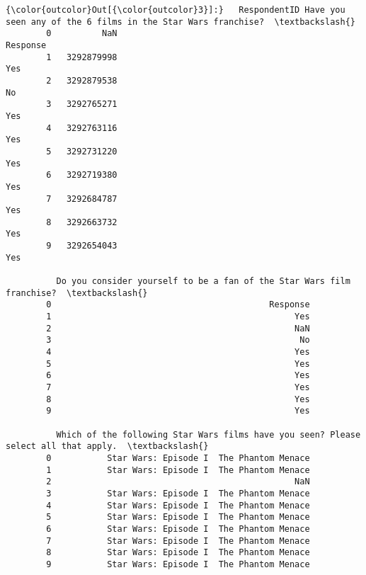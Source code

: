 \documentclass[11pt]{article}
\begin{document}
\begin{Verbatim}[commandchars=\\\{\}]
{\color{outcolor}Out[{\color{outcolor}3}]:}   RespondentID Have you seen any of the 6 films in the Star Wars franchise?  \textbackslash{}
        0          NaN                                           Response             
        1   3292879998                                                Yes             
        2   3292879538                                                 No             
        3   3292765271                                                Yes             
        4   3292763116                                                Yes             
        5   3292731220                                                Yes             
        6   3292719380                                                Yes             
        7   3292684787                                                Yes             
        8   3292663732                                                Yes             
        9   3292654043                                                Yes             
        
          Do you consider yourself to be a fan of the Star Wars film franchise?  \textbackslash{}
        0                                           Response                      
        1                                                Yes                      
        2                                                NaN                      
        3                                                 No                      
        4                                                Yes                      
        5                                                Yes                      
        6                                                Yes                      
        7                                                Yes                      
        8                                                Yes                      
        9                                                Yes                      
        
          Which of the following Star Wars films have you seen? Please select all that apply.  \textbackslash{}
        0           Star Wars: Episode I  The Phantom Menace                                    
        1           Star Wars: Episode I  The Phantom Menace                                    
        2                                                NaN                                    
        3           Star Wars: Episode I  The Phantom Menace                                    
        4           Star Wars: Episode I  The Phantom Menace                                    
        5           Star Wars: Episode I  The Phantom Menace                                    
        6           Star Wars: Episode I  The Phantom Menace                                    
        7           Star Wars: Episode I  The Phantom Menace                                    
        8           Star Wars: Episode I  The Phantom Menace                                    
        9           Star Wars: Episode I  The Phantom Menace                                    
        

\end{Verbatim}
\end{document}
